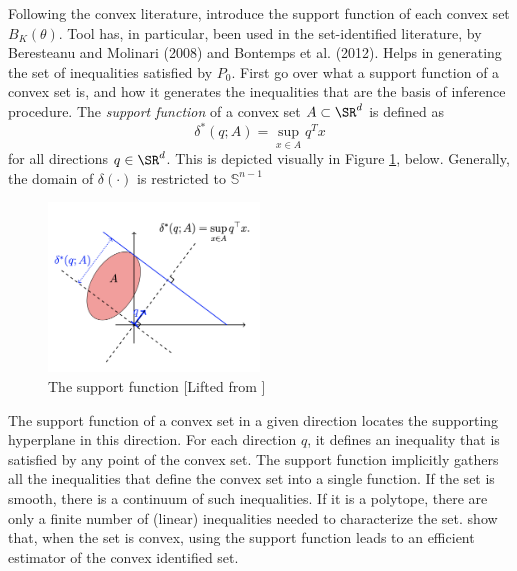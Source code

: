 Following the convex literature, introduce the support function of each convex set $B_K(\theta)$. Tool has, in particular, been used in the set-identified literature, by Beresteanu and Molinari (2008) and Bontemps et al. (2012). Helps in generating the set of inequalities satisfied by $P_0$. First go over what a support function of a convex set is, and how it generates the inequalities that are the basis of inference procedure. The \emph{support function} of a convex set $A\subset \SR^d$ is defined as 
\[\delta^*(q;A)= \sup_{x\in A} q^T x\]
for all directions $q \in \SR^d$. This is depicted visually in Figure \ref{fig:BK-Fig1}, below. Generally, the domain of $\delta(\cdot)$ is restricted to $\mathbb{S}^{n-1}$
\begin{figure}[htb!]
	\centering
	\includegraphics[width=0.50\textwidth]{figures/BK-Fig1.png}
	\caption{The support function [Lifted from \citet{BK-2020}]}
	\label{fig:BK-Fig1}
\end{figure}
The support function of a convex set in a given direction locates the supporting hyperplane in this direction. For each direction $q$, it defines an inequality that is satisfied by any point of the convex set. The support function implicitly gathers all the inequalities that define the convex set into a single function. If the set is smooth, there is a continuum of such inequalities. If it is a polytope, there are only a finite number of (linear) inequalities needed to characterize the set. \citet{KS-2014} show that, when the set is convex, using the support function leads to an efficient estimator of the convex identified set.

